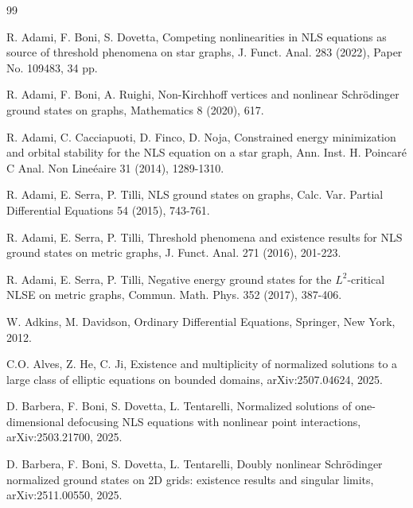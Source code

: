 \documentclass[11pt]{amsart}
\numberwithin{equation}{section}
\begin{document}
 
\begin{thebibliography}{99}

R. Adami, F. Boni, S. Dovetta, Competing nonlinearities in NLS equations as source of threshold phenomena on star graphs, J. Funct. Anal. 283 (2022), Paper No. 109483, 34 pp.

R. Adami, F. Boni, A. Ruighi, Non-Kirchhoff vertices and nonlinear Schr\"odinger ground states on graphs, Mathematics 8 (2020), 617.

R. Adami, C. Cacciapuoti, D. Finco, D. Noja, Constrained energy minimization and orbital stability for the NLS equation on a star graph, Ann. Inst. H. Poincar\'{e} C Anal. Non Line\'{e}aire 31 (2014), 1289-1310.

R. Adami, E. Serra, P. Tilli, NLS ground states on graphs, Calc. Var. Partial Differential Equations 54 (2015), 743-761.

R. Adami, E. Serra, P. Tilli, Threshold phenomena and existence results for NLS ground states on metric graphs, J. Funct. Anal. 271 (2016), 201-223.

R. Adami, E. Serra, P. Tilli, Negative energy ground states for the $L^2$-critical NLSE on metric graphs, Commun. Math. Phys. 352 (2017), 387-406.


W. Adkins, M. Davidson, Ordinary Differential Equations, Springer, New York, 2012.


C.O. Alves, Z. He, C. Ji, Existence and multiplicity of normalized solutions to a large class of elliptic equations on bounded domains, arXiv:2507.04624, 2025.

D. Barbera, F. Boni, S. Dovetta, L. Tentarelli, Normalized solutions of one-dimensional defocusing NLS equations with nonlinear point interactions, arXiv:2503.21700, 2025.

D. Barbera, F. Boni, S. Dovetta, L. Tentarelli, Doubly nonlinear Schr\"odinger normalized ground states on 2D grids: existence results and singular limits, arXiv:2511.00550, 2025.

  

\end{thebibliography}
\end{document}
